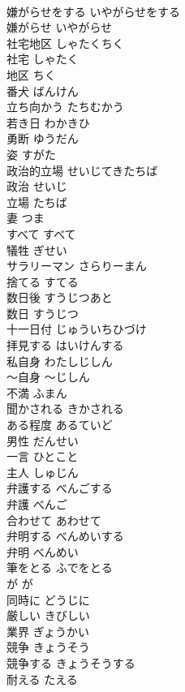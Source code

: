 \documentclass[8pt]{extreport}
\begin{document}
\begin{CJK}{UTF8}{min}
\\	嫌がらせをする	いやがらせをする	
\\	嫌がらせ	いやがらせ	
\\	社宅地区	しゃたくちく	
\\	社宅	しゃたく	
\\	地区	ちく	
\\	番犬	ばんけん	
\\	立ち向かう	たちむかう	
\\	若き日	わかきひ	
\\	勇断	ゆうだん	
\\	姿	すがた	
\\	政治的立場	せいじてきたちば	
\\	政治	せいじ	
\\	立場	たちば	
\\	妻	つま	
\\	すべて	すべて	
\\	犠牲	ぎせい	
\\	サラリーマン	さらりーまん	
\\	捨てる	すてる	
\\	数日後	すうじつあと	
\\	数日	すうじつ	
\\	十一日付	じゅういちひづけ	
\\	拝見する	はいけんする	
\\	私自身	わたしじしん	
\\	〜自身	〜じしん	
\\	不満	ふまん	
\\	聞かされる	きかされる	
\\	ある程度	あるていど	
\\	男性	だんせい	
\\	一言	ひとこと	
\\	主人	しゅじん	
\\	弁護する	べんごする	
\\	弁護	べんご	
\\	合わせて	あわせて	
\\	弁明する	べんめいする	
\\	弁明	べんめい	
\\	筆をとる	ふでをとる	
\\	が	が	
\\	同時に	どうじに	
\\	厳しい	きびしい	
\\	業界	ぎょうかい	
\\	競争	きょうそう	
\\	競争する	きょうそうする	
\\	耐える	たえる	

\end{CJK}
\end{document}

